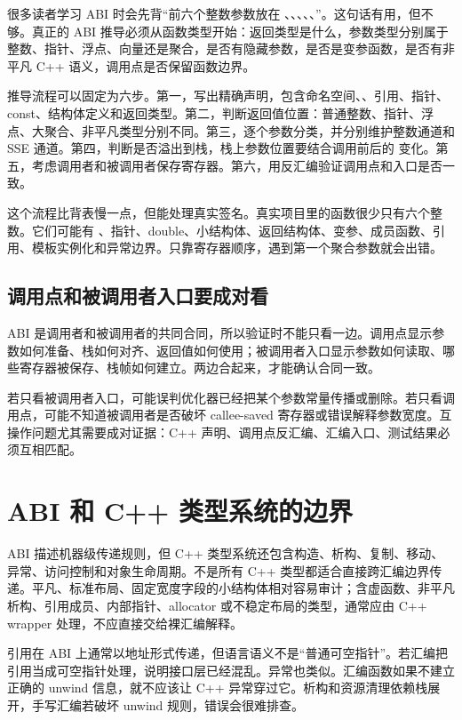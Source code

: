 很多读者学习 ABI 时会先背“前六个整数参数放在 、、、、、”。这句话有用，但不够。真正的 ABI 推导必须从函数类型开始：返回类型是什么，参数类型分别属于整数、指针、浮点、向量还是聚合，是否有隐藏参数，是否是变参函数，是否有非平凡 C++ 语义，调用点是否保留函数边界。

推导流程可以固定为六步。第一，写出精确声明，包含命名空间、、引用、指针、const、结构体定义和返回类型。第二，判断返回值位置：普通整数、指针、浮点、大聚合、非平凡类型分别不同。第三，逐个参数分类，并分别维护整数通道和 SSE 通道。第四，判断是否溢出到栈，栈上参数位置要结合调用前后的  变化。第五，考虑调用者和被调用者保存寄存器。第六，用反汇编验证调用点和入口是否一致。

这个流程比背表慢一点，但能处理真实签名。真实项目里的函数很少只有六个整数。它们可能有 、指针、double、小结构体、返回结构体、变参、成员函数、引用、模板实例化和异常边界。只靠寄存器顺序，遇到第一个聚合参数就会出错。

\subsection{调用点和被调用者入口要成对看}

ABI 是调用者和被调用者的共同合同，所以验证时不能只看一边。调用点显示参数如何准备、栈如何对齐、返回值如何使用；被调用者入口显示参数如何读取、哪些寄存器被保存、栈帧如何建立。两边合起来，才能确认合同一致。

若只看被调用者入口，可能误判优化器已经把某个参数常量传播或删除。若只看调用点，可能不知道被调用者是否破坏 callee-saved 寄存器或错误解释参数宽度。互操作问题尤其需要成对证据：C++ 声明、调用点反汇编、汇编入口、测试结果必须互相匹配。

\section{ABI 和 C++ 类型系统的边界}

ABI 描述机器级传递规则，但 C++ 类型系统还包含构造、析构、复制、移动、异常、访问控制和对象生命周期。不是所有 C++ 类型都适合直接跨汇编边界传递。平凡、标准布局、固定宽度字段的小结构体相对容易审计；含虚函数、非平凡析构、引用成员、内部指针、allocator 或不稳定布局的类型，通常应由 C++ wrapper 处理，不应直接交给裸汇编解释。

引用在 ABI 上通常以地址形式传递，但语言语义不是“普通可空指针”。若汇编把引用当成可空指针处理，说明接口层已经混乱。异常也类似。汇编函数如果不建立正确的 unwind 信息，就不应该让 C++ 异常穿过它。析构和资源清理依赖栈展开，手写汇编若破坏 unwind 规则，错误会很难排查。

